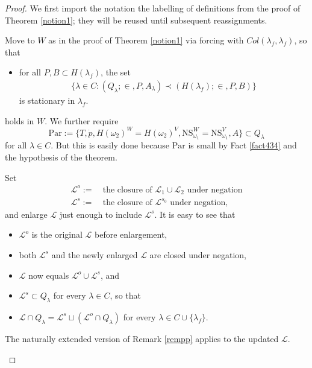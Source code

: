 \documentclass[12pt]{article}
\numberwithin{equation}{section}
\begin{document}
\begin{proof}
We first import the notation the labelling of definitions from the proof of Theorem \ref{notion1}; they will be reused until subsequent reassignments. 

Move to $W$ as in the proof of Theorem \ref{notion1} via forcing with $Col(\lambda_f, \lambda_f)$, so that 
\begin{itemize}[label=($\diamond$)]
    \item for all $P, B \subset H(\lambda_f)$, the set
    \begin{align*}
        \{\lambda \in C : (Q_{\lambda}; \in, P, A_{\lambda}) \prec (H(\lambda_f); \in, P, B)\}
    \end{align*}
    is stationary in $\lambda_f$.
\end{itemize}
holds in $W$. We further require 
\begin{equation*}
    \mathrm{Par} := \{T, \dot{p}, H(\omega_2)^W = H(\omega_2)^V, \mathrm{NS}_{\omega_1}^W = \mathrm{NS}_{\omega_1}^V, A\} \subset Q_{\lambda}
\end{equation*}
for all $\lambda \in C$. But this is easily done because $\mathrm{Par}$ is small by Fact \ref{fact434} and the hypothesis of the theorem. 

Set
\begin{align*}
    \mathcal{L}^o := \ & \text{the closure of } \mathcal{L}_1 \cup \mathcal{L}_2 \text{ under negation} \\
    \mathcal{L}^s := \ & \text{the closure of } \mathcal{L}^{s_0} \text{ under negation},
\end{align*}
and enlarge $\mathcal{L}$ just enough to include $\mathcal{L}^s$. It is easy to see that
\begin{itemize}
    \item $\mathcal{L}^o$ is the original $\mathcal{L}$ before enlargement,
    \item both $\mathcal{L}^s$ and the newly enlarged $\mathcal{L}$ are closed under negation, 
    \item $\mathcal{L}$ now equals $\mathcal{L}^o \cup \mathcal{L}^s$, and
    \item $\mathcal{L}^s \subset Q_{\lambda}$ for every $\lambda \in C$, so that
    \item $\mathcal{L} \cap Q_{\lambda} = \mathcal{L}^s \sqcup (\mathcal{L}^o \cap Q_{\lambda})$ for every $\lambda \in C \cup \{\lambda_f\}$.
\end{itemize}

\begin{rem}\label{rempp2}
The naturally extended version of Remark \ref{rempp} applies to the updated $\mathcal{L}$.
\end{rem}


\end{proof}
\end{document}
